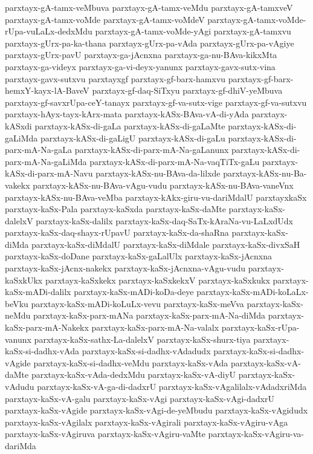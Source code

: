 {parxtayx-gA-tamx-veMbuva
parxtayx-gA-tamx-veMdu
parxtayx-gA-tamxveV
parxtayx-gA-tamx-voMde
parxtayx-gA-tamx-voMdeV
parxtayx-gA-tamx-voMde-rUpa-vuLaLx-dedxMdu
parxtayx-gA-tamx-voMde-yAgi
parxtayx-gA-tamxvu
parxtayx-gUrx-pa-ka-thana
parxtayx-gUrx-pa-vAda
parxtayx-gUrx-pa-vAgiye
parxtayx-gUrx-pavU
parxtayx-ga-jAcnxna
parxtayx-ga-nu-BAva-kikxMta
parxtayx-ga-videyx
parxtayx-ga-vi-deyx-yanunx
parxtayx-gavx-sutx-vina
parxtayx-gavx-sutxvu
parxtayxgf
parxtayx-gf-barx-hamxvu
parxtayx-gf-barx-hemxY-kayx-lA-BaveV
parxtayx-gf-daq-SiTxyu
parxtayx-gf-dhiV-yeMbuva
parxtayx-gf-savxrUpa-ceY-tanayx
parxtayx-gf-va-sutx-vige
parxtayx-gf-va-sutxvu
parxtayx-hAyx-tayx-kArx-mata
parxtayx-kASx-BAva-vA-di-yAda
parxtayx-kASxdi
parxtayx-kASx-di-gaLa
parxtayx-kASx-di-gaLaMte
parxtayx-kASx-di-gaLiMda
parxtayx-kASx-di-gaLigU
parxtayx-kASx-di-gaLu
parxtayx-kASx-di-parx-mA-Na-gaLa
parxtayx-kASx-di-parx-mA-Na-gaLanunx
parxtayx-kASx-di-parx-mA-Na-gaLiMda
parxtayx-kASx-di-parx-mA-Na-vaqTiTx-gaLu
parxtayx-kASx-di-parx-mA-Navu
parxtayx-kASx-nu-BAva-da-lilxde
parxtayx-kASx-nu-Ba-vakekx
parxtayx-kASx-nu-BAva-vAgu-vudu
parxtayx-kASx-nu-BAva-vaneVnx
parxtayx-kASx-nu-BAva-veMba
parxtayx-kAkx-giru-vu-dariMdalU
parxtayxkaSx
parxtayx-kaSx-Pala
parxtayx-kaSxda
parxtayx-kaSx-daMte
parxtayx-kaSx-dalelxV
parxtayx-kaSx-dalilx
parxtayx-kaSx-daq-SaTx-kAraNa-vu-LaLxdUdx
parxtayx-kaSx-daq-shayx-rUpavU
parxtayx-kaSx-da-shaRna
parxtayx-kaSx-diMda
parxtayx-kaSx-diMdalU
parxtayx-kaSx-diMdale
parxtayx-kaSx-divxSaH
parxtayx-kaSx-doDane
parxtayx-kaSx-gaLalUlx
parxtayx-kaSx-jAcnxna
parxtayx-kaSx-jAcnx-nakekx
parxtayx-kaSx-jAcnxna-vAgu-vudu
parxtayx-kaSxkUkx
parxtayx-kaSxkekx
parxtayx-kaSxkekxV
parxtayx-kaSxkukx
parxtayx-kaSx-mADi-dalilx
parxtayx-kaSx-mADi-koDa-deye
parxtayx-kaSx-mADi-koLaLx-beVku
parxtayx-kaSx-mADi-koLuLx-vevu
parxtayx-kaSx-meVva
parxtayx-kaSx-neMdu
parxtayx-kaSx-parx-mANa
parxtayx-kaSx-parx-mA-Na-diMda
parxtayx-kaSx-parx-mA-Nakekx
parxtayx-kaSx-parx-mA-Na-valalx
parxtayx-kaSx-rUpa-vanunx
parxtayx-kaSx-sathx-La-dalelxV
parxtayx-kaSx-shurx-tiya
parxtayx-kaSx-si-dadhx-vAda
parxtayx-kaSx-si-dadhx-vAdadudx
parxtayx-kaSx-si-dadhx-vAgide
parxtayx-kaSx-si-dadhx-veMdu
parxtayx-kaSx-vAda
parxtayx-kaSx-vA-daMte
parxtayx-kaSx-vAda-dedxMdu
parxtayx-kaSx-vA-diyU
parxtayx-kaSx-vAdudu
parxtayx-kaSx-vA-ga-di-dadxrU
parxtayx-kaSx-vAgalilalx-vAdadxriMda
parxtayx-kaSx-vA-galu
parxtayx-kaSx-vAgi
parxtayx-kaSx-vAgi-dadxrU
parxtayx-kaSx-vAgide
parxtayx-kaSx-vAgi-de-yeMbudu
parxtayx-kaSx-vAgidudx
parxtayx-kaSx-vAgilalx
parxtayx-kaSx-vAgirali
parxtayx-kaSx-vAgiru-vAga
parxtayx-kaSx-vAgiruva
parxtayx-kaSx-vAgiru-vaMte
parxtayx-kaSx-vAgiru-va-dariMda
}
